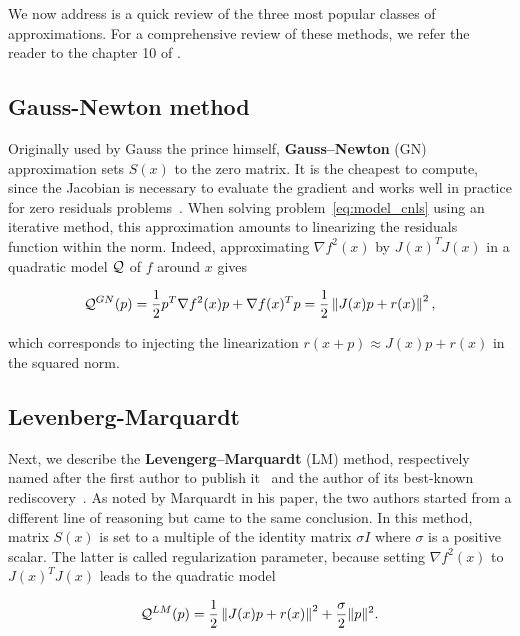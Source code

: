 \documentclass[10pt]{article}
\numberwithin{equation}{section}
\begin{document}
	 We now address is a quick review of the three most popular classes of approximations. For a comprehensive review of these methods, we refer the reader to the chapter 10 of \cite{dennisschnabel:1996}.
	 
	 \subsection{Gauss-Newton method}
	 
	 Originally used by Gauss the prince himself, \textbf{Gauss--Newton} (GN) approximation sets $S(x)$ to the zero matrix. It is the cheapest to compute, since the Jacobian is necessary to evaluate the gradient and works well in practice for zero residuals problems~\cite{dennisschnabel:1996}. When solving problem~\eqref{eq:model_cnls} using an iterative method, this approximation amounts to linearizing the residuals function within the norm. Indeed, approximating $\nabla f^2(x)$ by $J(x)^TJ(x)$ in a quadratic model ${\mathcal{Q}}$ of $f$ around $x$ gives
	 
	 \begin{equation}\label{eq:gn_model}
	 	{\mathcal{Q}}^{GN} (p) = \dfrac{1}{2}p^T\nabla f^2(x)p + \nabla f(x)^Tp =  \dfrac{1}{2} \left\Vert J(x)p+r(x) \right\Vert^2,
	 \end{equation}
	 
	 which corresponds to injecting the linearization $r(x+p) \approx J(x)p+r(x)$ in the squared norm.
	 
	 \subsection{Levenberg-Marquardt}
	 
	 Next, we describe the \textbf{Levengerg--Marquardt} (LM) method, respectively named after the first author to publish it~\cite{levenberg:1944} and the author of its best-known rediscovery~\cite{marquardt:1963}. As noted by Marquardt in his paper, the two authors started from a different line of reasoning but came to the same conclusion. In this method, matrix $S(x)$ is set to a multiple of the identity matrix $\sigma I$ where $\sigma$ is a positive scalar. The latter is called regularization parameter, because setting  $\nabla f^2(x)$ to $J(x)^TJ(x)$ leads to the quadratic model 
	 
	 \begin{equation}\label{eq:lm_model}
	 	{\mathcal{Q}}^{LM}(p) =  \dfrac{1}{2} \left\Vert J(x)p+r(x) \right\Vert^2 + \dfrac{\sigma}{2} \|p\|^2.
	 \end{equation}
	 
\end{document}
